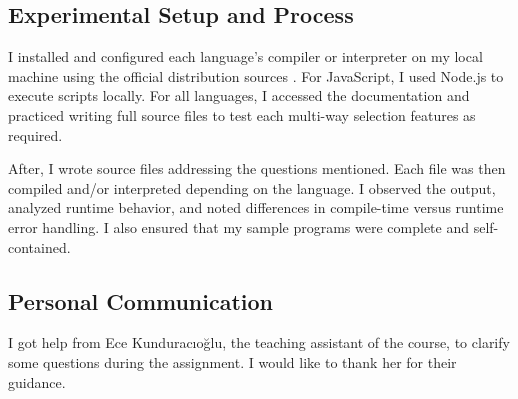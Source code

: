\documentclass{article}
\begin{document}
\subsection{Experimental Setup and Process}

I installed and configured each language's compiler or interpreter on my local machine using the official distribution sources \cite{dartcomp, gocomp, jscomp, kotlinc, phpcomp, pycomp, rustcomp}. For JavaScript, I used Node.js to execute scripts locally. For all languages, I accessed the documentation and practiced writing full source files to test each multi-way selection features as required.

After, I wrote source files addressing the questions mentioned. Each file was then compiled and/or interpreted depending on the language. I observed the output, analyzed runtime behavior, and noted differences in compile-time versus runtime error handling. I also ensured that my sample programs were complete and self-contained.

\subsection{Personal Communication}
I got help from Ece Kunduracıoğlu, the teaching assistant of the course, to clarify some questions during the assignment. I would like to thank her for their guidance.

\newpage



\end{document}
